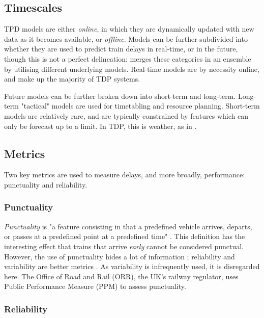 \documentclass{article}
\begin{document}
\subsection{Timescales}

TPD models are either \textit{online}, in which they are dynamically updated with new data as it becomes available, or \textit{offline}. Models can be further subdivided into whether they are used to predict train delays in real-time, or in the future, though this is not a perfect delineation: \cite{nair_et_al_2019} merges these categories in an ensemble by utilising different underlying models.   Real-time models are by necessity online, and make up the majority of TDP systems.

Future models can be further broken down into short-term and long-term. Long-term "tactical" \cite{markovic_et_al_2015} models are used for timetabling and resource planning. Short-term models are relatively rare, and are typically constrained by features which can only be forecast up to a limit. In TDP, this is weather, as in \cite{nair_et_al_2019}\cite{wang_et_al_2019}.

\subsection{Metrics}

Two key metrics are used to measure delays, and more broadly, performance: punctuality and reliability. 

\subsubsection{Punctuality}

\textit{Punctuality} is "a feature consisting in that a predefined vehicle arrives, departs, or passes at a predefined point at a predefined time" \cite{rudnicki_1997}. This definition has the interesting effect that trains 
that arrive \textit{early} cannot be considered punctual. However, the use of punctuality hides a lot of information \cite{skagestad_2004}; reliability and variability are better metrics \cite{olsson_haugland_2004}. As variability is infrequently used, it is disregarded here. The Office of Road and Rail (ORR), the UK's railway regulator, uses Public Performance Measure (PPM) to assess punctuality.

\subsubsection{Reliability}
\end{document}
